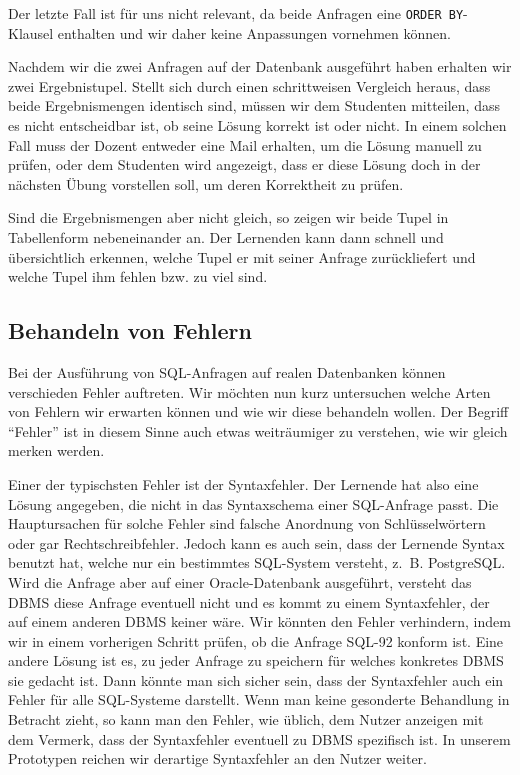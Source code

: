 Der letzte Fall ist für uns nicht relevant, da beide Anfragen eine \verb|ORDER BY|-Klausel enthalten und wir daher keine Anpassungen vornehmen können. 

Nachdem wir die zwei Anfragen auf der Datenbank ausgeführt haben erhalten wir zwei Ergebnistupel. Stellt sich durch einen schrittweisen Vergleich heraus, dass beide Ergebnismengen identisch sind, müssen wir dem Studenten mitteilen, dass es nicht entscheidbar ist, ob seine Lösung korrekt ist oder nicht. In einem solchen Fall muss der Dozent entweder eine Mail erhalten, um die Lösung manuell zu prüfen, oder dem Studenten wird angezeigt, dass er diese Lösung doch in der nächsten Übung vorstellen soll, um deren Korrektheit zu prüfen.

Sind die Ergebnismengen aber nicht gleich, so zeigen wir beide Tupel in Tabellenform nebeneinander an. Der Lernenden kann dann schnell und übersichtlich erkennen, welche Tupel er mit seiner Anfrage zurückliefert und welche Tupel ihm fehlen bzw. zu viel sind.

\subsection{Behandeln von Fehlern}

Bei der Ausführung von SQL-Anfragen auf realen Datenbanken können verschieden Fehler auftreten. Wir möchten nun kurz untersuchen welche Arten von Fehlern wir erwarten können und wie wir diese behandeln wollen. Der Begriff "`Fehler"' ist in diesem Sinne auch etwas weiträumiger zu verstehen, wie wir gleich merken werden.

Einer der typischsten Fehler ist der Syntaxfehler. Der Lernende hat also eine Lösung angegeben, die nicht in das Syntaxschema einer SQL-Anfrage passt. Die Hauptursachen für solche Fehler sind falsche Anordnung von Schlüsselwörtern oder gar Rechtschreibfehler. Jedoch kann es auch sein, dass der Lernende Syntax benutzt hat, welche nur ein bestimmtes SQL-System versteht, \mbox{z. B.} PostgreSQL. Wird die Anfrage aber auf einer Oracle-Datenbank ausgeführt, versteht das DBMS diese Anfrage eventuell nicht und es kommt zu einem Syntaxfehler, der auf einem anderen DBMS keiner wäre. Wir könnten den Fehler verhindern, indem wir in einem vorherigen Schritt prüfen, ob die Anfrage SQL-92 konform ist. Eine andere Lösung ist es, zu jeder Anfrage zu speichern für welches konkretes DBMS sie gedacht ist. Dann könnte man sich sicher sein, dass der Syntaxfehler auch ein Fehler für alle SQL-Systeme darstellt. Wenn man keine gesonderte Behandlung in Betracht zieht, so kann man den Fehler, wie üblich, dem Nutzer anzeigen mit dem Vermerk, dass der Syntaxfehler eventuell zu DBMS spezifisch ist. In unserem Prototypen reichen wir derartige Syntaxfehler an den Nutzer weiter.

